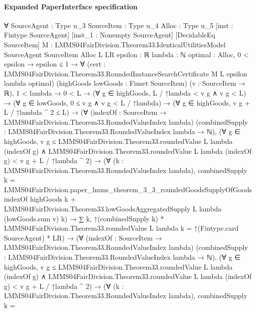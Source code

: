 \documentclass[10pt]{article}
\begin{document}
\paragraph{Expanded PaperInterface specification}
\begin{ReviewVerbatim}
∀ {SourceAgent : Type u_3} {SourceItem : Type u_4} {Alloc : Type u_5} [inst : Fintype SourceAgent]
  [inst_1 : Nonempty SourceAgent] [DecidableEq SourceItem]
  {M : LMMS04FairDivision.Theorem33.IdenticalUtilitiesModel SourceAgent SourceItem Alloc} {L LR epsilon : ℝ}
  {lambda : ℕ} {optimal : Alloc},
  0 < epsilon →
    epsilon ≤ 1 →
      ∀ (cert : LMMS04FairDivision.Theorem33.RoundedInstanceSearchCertificate M L epsilon lambda optimal)
        (highGoods lowGoods : Finset SourceItem) (v : SourceItem → ℝ),
        1 < lambda →
          0 < L →
            (∀ g ∈ highGoods, L / ↑lambda < v g ∧ v g < L) →
              (∀ g ∈ lowGoods, 0 ≤ v g ∧ v g < L / ↑lambda) →
                (∀ g ∈ highGoods, v g + L / ↑lambda ^ 2 ≤ L) →
                  (∀ (indexOf : SourceItem → LMMS04FairDivision.Theorem33.RoundedValueIndex lambda)
                      (combinedSupply : LMMS04FairDivision.Theorem33.RoundedValueIndex lambda → ℕ),
                      (∀ g ∈ highGoods,
                          v g ≤ LMMS04FairDivision.Theorem33.roundedValue L lambda (indexOf g) ∧
                            LMMS04FairDivision.Theorem33.roundedValue L lambda (indexOf g) < v g + L / ↑lambda ^ 2) →
                        (∀ (k : LMMS04FairDivision.Theorem33.RoundedValueIndex lambda),
                            combinedSupply k =
                              LMMS04FairDivision.paper_lmms_theorem_3_3_roundedGoodsSupplyOfGoods indexOf highGoods k +
                                LMMS04FairDivision.Theorem33.lowGoodsAggregatedSupply L lambda (lowGoods.sum v) k) →
                          ∑ k, ↑(combinedSupply k) * LMMS04FairDivision.Theorem33.roundedValue L lambda k =
                            ↑(Fintype.card SourceAgent) * LR) →
                    (∀ (indexOf : SourceItem → LMMS04FairDivision.Theorem33.RoundedValueIndex lambda)
                        (combinedSupply : LMMS04FairDivision.Theorem33.RoundedValueIndex lambda → ℕ),
                        (∀ g ∈ highGoods,
                            v g ≤ LMMS04FairDivision.Theorem33.roundedValue L lambda (indexOf g) ∧
                              LMMS04FairDivision.Theorem33.roundedValue L lambda (indexOf g) < v g + L / ↑lambda ^ 2) →
                          (∀ (k : LMMS04FairDivision.Theorem33.RoundedValueIndex lambda),
                              combinedSupply k =

\end{ReviewVerbatim}
\end{document}
